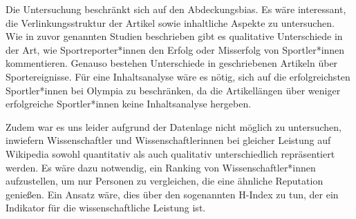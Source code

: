 \documentclass[11pt]{article}
\begin{document}
Die Untersuchung beschränkt sich auf den Abdeckungsbias. Es wäre interessant, die Verlinkungsstruktur der Artikel sowie inhaltliche Aspekte zu untersuchen. Wie in zuvor genannten Studien beschrieben gibt es qualitative Unterschiede in der Art, wie Sportreporter*innen den Erfolg oder Misserfolg von Sportler*innen kommentieren. Genauso bestehen Unterschiede in  geschriebenen Artikeln über Sportereignisse. Für eine Inhaltsanalyse wäre es nötig, sich auf die erfolgreichsten Sportler*innen bei Olympia zu beschränken, da die Artikellängen über weniger erfolgreiche Sportler*innen keine Inhaltsanalyse hergeben.

Zudem war es uns leider aufgrund der Datenlage nicht möglich zu untersuchen, inwiefern Wissenschaftler und Wissenschaftlerinnen bei gleicher Leistung auf Wikipedia sowohl quantitativ als auch qualitativ unterschiedlich repräsentiert werden. Es wäre dazu notwendig, ein Ranking von Wissenschaftler*innen aufzustellen, um nur Personen zu vergleichen, die eine ähnliche Reputation genießen. Ein Ansatz wäre, dies über den sogenannten H-Index zu tun, der ein Indikator für die wissenschaftliche Leistung ist\parencite{hIndex}.

\printbibliography
\end{document}
